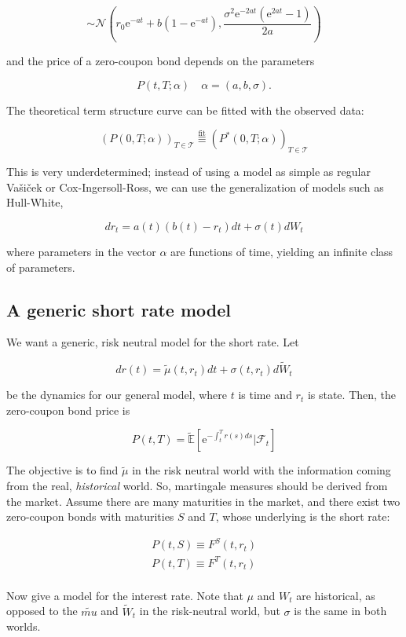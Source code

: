 \documentclass[oneside,titlepage,headinclude,12pt,a4paper,BCOR5mm,footinclude]{book}
\theoremstyle{defn}
\newcommand{\eexp}{\mathrm{e}}
\newcommand{\rnE}[1]{\mathbb{\tilde E}\left[ {#1} \right]}
\newcommand\NN{\mathcal{N}}
\begin{document}
\[
  \sim \NN\left(
    r_0 \eexp^{-at}+b(1-\eexp^{-at}), \frac{\sigma^2\eexp^{-2at}(\eexp^{2at}-1)}{2a}
  \right)
\]

and the price of a zero-coupon bond depends on the parameters

\[
  P(t,T;\alpha) \quad \alpha = (a,b,\sigma).
\]

The theoretical term structure curve can be fitted with the observed data:

\[
  \left( P(0,T;\alpha)\right)_{T\in \mathcal{T}} \stackrel{\text{fit}}{\equiv}
  \left( P^*(0,T;\alpha)\right)_{T\in \mathcal{T}} 
\]

This is  very underdetermined;  instead of  using a model  as simple  as regular
Va\v{s}i\v{c}ek or Cox-Ingersoll-Ross,  we can use the  generalization of models
such as Hull-White,

\[
  dr_t = a(t)(b(t) - r_t)dt +\sigma(t)dW_t
\]

where  parameters in  the vector  $\alpha$ are  functions of  time, yielding  an
infinite class of parameters.

\subsection{A generic short rate model}

We want a generic, risk neutral model for the short rate. Let

\[
  dr(t) = \tilde{\mu}(t,r_t)dt + \sigma(t,r_t)d\tilde{W}_t
\]

be the  dynamics for our general  model, where $t$  is time and $r_t$  is state.
Then, the zero-coupon bond price is

\[
  P(t,T) = \rnE{\eexp^{-\int_t^T r(s)ds} \Big| \mathcal{F}_t}
\]

The  objective is  to find  $\tilde{\mu}$  in the  risk neutral  world with  the
information  coming from  the  real, \textit{historical}  world. So,  martingale
measures should be derived from the  market. Assume there are many maturities in
the market, and  there exist two zero-coupon bonds with  maturities $S$ and $T$,
whose underlying is the short rate:

\begin{gather*}
  P(t,S) \equiv F^S(t,r_t) \\
  P(t,T) \equiv F^T(t,r_t) \\
\end{gather*}

Now  give  a  model for  the  interest  rate.  Note  that $\mu$  and  $W_t$  are
historical, as opposed to the $\tilde{mu}$ and $\tilde{W}_t$ in the risk-neutral
world, but $\sigma$ is the same in both worlds.
\end{document}
